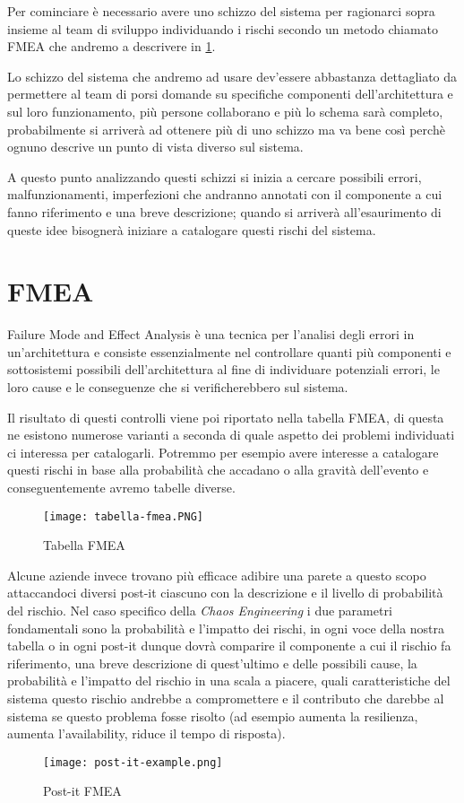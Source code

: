 Per cominciare è necessario avere uno schizzo del sistema per ragionarci sopra insieme al team di sviluppo individuando i rischi secondo un metodo chiamato FMEA che andremo a descrivere in \ref{sec:fmea}.

Lo schizzo del sistema che andremo ad usare dev'essere abbastanza dettagliato da permettere al team di porsi domande su specifiche componenti dell'architettura e sul loro funzionamento, più persone collaborano e più lo schema sarà completo, probabilmente si arriverà ad ottenere più di uno schizzo ma va bene così perchè ognuno descrive un punto di vista diverso sul sistema.

A questo punto analizzando questi schizzi si inizia a cercare possibili errori, malfunzionamenti, imperfezioni che andranno annotati con il componente a cui fanno riferimento e una breve descrizione; quando si arriverà all'esaurimento di queste idee bisognerà iniziare a catalogare questi rischi del sistema.

\section{FMEA}
\label{sec:fmea}
Failure Mode and Effect Analysis è una tecnica per l'analisi degli errori in un'architettura e consiste essenzialmente nel controllare quanti più componenti e sottosistemi possibili dell'architettura al fine di individuare potenziali errori, le loro cause e le conseguenze che si verificherebbero sul sistema.

Il risultato di questi controlli viene poi riportato nella tabella FMEA, di questa ne esistono numerose varianti a seconda di quale aspetto dei problemi individuati ci interessa per catalogarli.
Potremmo per esempio avere interesse a catalogare questi rischi in base alla probabilità che accadano o alla gravità dell'evento e conseguentemente avremo tabelle diverse.
\begin{figure}[H]
    \centering
    \texttt{[image: tabella-fmea.PNG]}
    \label{tab:esempio-tabella-fmea}
    \caption{Tabella FMEA}
\end{figure}

Alcune aziende invece trovano più efficace adibire una parete a questo scopo attaccandoci diversi post-it ciascuno con la descrizione e il livello di probabilità del rischio.
Nel caso specifico della \textit{Chaos Engineering} i due parametri fondamentali sono la probabilità e l'impatto dei rischi, in ogni voce della nostra tabella o in ogni post-it dunque dovrà comparire il componente a cui il rischio fa riferimento, una breve descrizione di quest'ultimo e delle possibili cause, la probabilità e l'impatto del rischio in una scala a piacere, quali caratteristiche del sistema questo rischio andrebbe a compromettere e il contributo che darebbe al sistema se questo problema fosse risolto (ad esempio aumenta la resilienza, aumenta l'availability, riduce il tempo di risposta).
\begin{figure}[H]
    \centering
    \texttt{[image: post-it-example.png]}
    \label{tab:fmea-post-it}
    \caption{Post-it FMEA}
\end{figure}

